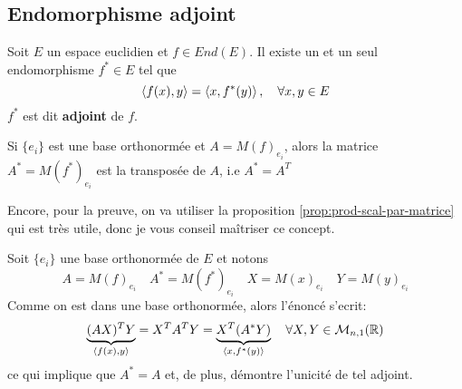 \subsection{Endomorphisme adjoint}
\begin{prop}
   Soit $E$ un espace euclidien et  $f \in End(E)$. Il existe un et un seul endomorphisme  $f^* \in E$ tel que
   \[
       \left\langle f(x), y \right\rangle = \left\langle x, f^*(y) \right\rangle, \quad \forall x, y \in E
   \] 
   $f^*$ est dit  \textbf{adjoint} de $f$.
   \par
   Si  $\{e_i\}$ est une base orthonormée et  $A = M(f)_{e_i}$, alors la matrice $A^* = M(f^*)_{e_i}$ est la transposée de $A$, i.e  $A^* = A^T$
\end{prop}
\begin{preuve}
    Encore, pour la preuve, on va utiliser la proposition \ref{prop:prod-scal-par-matrice} qui est très utile, donc je vous conseil maîtriser ce concept.
    \par
    Soit $\{e_i\}$ une base orthonormée de $E$ et notons
     \[
    A = M(f)_{e_i} \quad A^* = M(f^*)_{e_i} \quad X = M(x)_{e_i} \quad Y = M(y)_{e_i}
    \] 
    Comme on est dans une base orthonormée, alors l'énoncé s'ecrit:
    \[
        \underbrace{(AX)^TY}_{\left\langle f(x),y \right\rangle} = X^TA^TY = \underbrace{X^T(A^*Y)}_{\left\langle x, f^*(y) \right\rangle} \quad \forall X, Y \in \mathcal{M}_{n, 1}(\mathbb{R})
    \] 
    ce qui implique que $A^* = A$ et, de plus, démontre l'unicité de tel adjoint.
\end{preuve}
